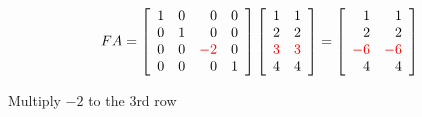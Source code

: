 \documentclass[pdf,9pt]{beamer}
\begin{document}
{\begin{example}[continued]
    \pause
    \begin{minipage}{0.65\textwidth}
    \[
	FA=
	\left[ \begin{array}{rrrr}
		1 & 0 & 0                   & 0 \\
		0 & 1 & 0                   & 0 \\
		0 & 0 & \textcolor{red}{-2} & 0 \\
		0 & 0 & 0                   & 1
	\end{array}\right]
	\left[ \begin{array}{rr}
		1 & 1 \\ 2 & 2 \\ \textcolor{red}{3} & \textcolor{red}{3} \\ 4 & 4
	\end{array}\right]=
	\left[ \begin{array}{rr}
		1 & 1 \\
		2 & 2 \\
		\textcolor{red}{-6} & \textcolor{red}{-6} \\
		4 & 4 \\
	\end{array}\right]
    \]
    \end{minipage}
    \hfill
    \begin{minipage}{0.3\textwidth}
    \begin{center}
       Multiply $-2$ to the 3rd row
    \end{center}
    \end{minipage}
    \pause


\end{example}}
\end{document}
